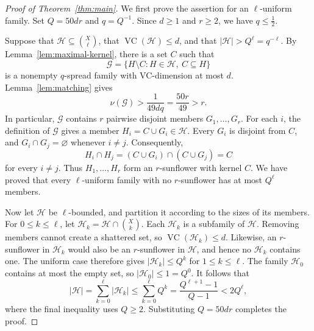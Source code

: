 \documentclass[11pt]{article}
\theoremstyle{definition}
\newcommand*{\abs}[1]{\lvert#1\rvert}
\newcommand{\cG}{\mathcal{G}}
\newcommand{\cH}{\mathcal{H}}
\newcommand{\VC}{\operatorname{VC}}
\begin{document}
\begin{proof}[Proof of Theorem~\ref{thm:main}]
We first prove the assertion for an \(\ell\)-uniform family. Set \(Q=50dr\) and \(q=Q^{-1}\). Since \(d\ge 1\) and \(r\ge 2\), we have \(q\le\frac{1}{2}\).

Suppose that \(\cH\subseteq\binom{X}{\ell}\), that \(\VC(\cH)\le d\), and that \(\abs{\cH}>Q^{\ell}=q^{-\ell}\). By Lemma~\ref{lem:maximal-kernel}, there is a set \(C\) such that
\[
\cG=\{H\setminus C:H\in\cH,\ C\subseteq H\}
\]
is a nonempty \(q\)-spread family with VC-dimension at most \(d\). Lemma~\ref{lem:matching} gives
\[
\nu(\cG)>\frac{1}{49dq}=\frac{50r}{49}>r.
\]
In particular, \(\cG\) contains \(r\) pairwise disjoint members \(G_{1},\ldots,G_{r}\). For each \(i\), the definition of \(\cG\) gives a member \(H_{i}=C\cup G_{i}\in\cH\). Every \(G_{i}\) is disjoint from \(C\), and \(G_{i}\cap G_{j}=\varnothing\) whenever \(i\ne j\). Consequently,
\[
H_{i}\cap H_{j}=(C\cup G_{i})\cap(C\cup G_{j})=C
\]
for every \(i\ne j\). Thus \(H_{1},\ldots,H_{r}\) form an \(r\)-sunflower with kernel \(C\). We have proved that every \(\ell\)-uniform family with no \(r\)-sunflower has at most \(Q^{\ell}\) members.

Now let \(\cH\) be \(\ell\)-bounded, and partition it according to the sizes of its members. For \(0\le k\le\ell\), let \(\cH_{k}=\cH\cap\binom{X}{k}\). Each \(\cH_{k}\) is a subfamily of \(\cH\). Removing members cannot create a shattered set, so \(\VC(\cH_{k})\le d\). Likewise, an \(r\)-sunflower in \(\cH_{k}\) would also be an \(r\)-sunflower in \(\cH\), and hence no \(\cH_{k}\) contains one. The uniform case therefore gives \(\abs{\cH_{k}}\le Q^{k}\) for \(1\le k\le\ell\). The family \(\cH_{0}\) contains at most the empty set, so \(\abs{\cH_{0}}\le 1=Q^{0}\). It follows that
\[
\abs{\cH}
=\sum_{k=0}^{\ell}\abs{\cH_{k}}
\le\sum_{k=0}^{\ell}Q^{k}
=\frac{Q^{\ell+1}-1}{Q-1}
<2Q^{\ell},
\]
where the final inequality uses \(Q\ge 2\). Substituting \(Q=50dr\) completes the proof.
\end{proof}



\end{document}
